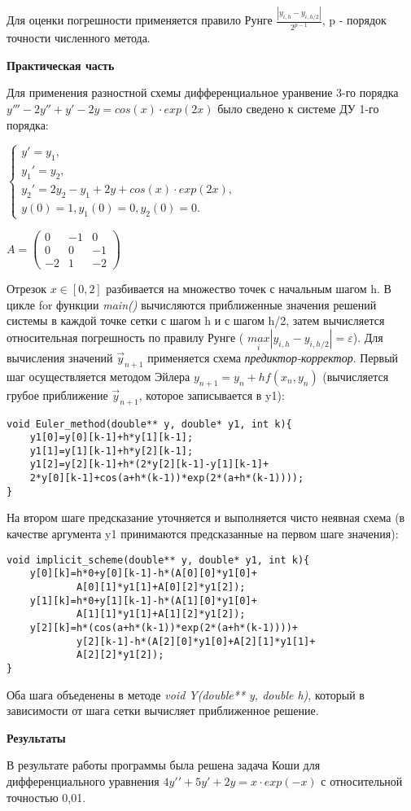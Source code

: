 \documentclass{article}
\begin{document}
Для оценки погрешности применяется правило Рунге \(\frac{|y_{i,h}-y_{i,h/2}|}{2^{p-1}}\), p - порядок точности численного метода.

\LARGE
\textbf{Практическая часть}

\Large
Для применения разностной схемы дифференциальное уранвение 3-го порядка \( y'''-2y''+y'-2y=cos(x)\cdot exp(2x)\) было сведено к системе ДУ 1-го порядка: 

\(\begin{cases}
 y'=y_{1}, \\ 
 y_{1}'=y_{2},\\ 
 y_{2}'=2y_{2}-y_{1}+2y+cos(x)\cdot exp(2x),\\
 y(0)=1,y_{1}(0)=0,y_{2}(0)=0.
\end{cases}\)

\(A=\begin{pmatrix}
0 & -1 & 0 \\ 
0 & 0 & -1\\ 
-2 & 1 & -2
\end{pmatrix}\)

Отрезок \(x\in [0,2]\) разбивается на множество точек с начальным шагом h.
В цикле for функции \textit{main()} вычисляются приближенные значения решений системы в каждой точке сетки с шагом h и с шагом h/2, затем вычисляется относительная погрешность по правилу Рунге ( \(\underset{i}{max}|y_{i,h}-y_{i,h/2}|=\varepsilon\)). Для вычисления значений \(\vec{y}_{n+1}\) применяется схема \textit{предиктор-корректор}. Первый шаг осуществляется методом Эйлера \(y_{n+1}=y_{n}+hf(x_{n},y_{n})\) (вычисляется грубое приближение \(\vec{y}_{n+1}\), которое записывается в y1): 
\begin{verbatim}
void Euler_method(double** y, double* y1, int k){
	y1[0]=y[0][k-1]+h*y[1][k-1];
	y1[1]=y[1][k-1]+h*y[2][k-1];
	y1[2]=y[2][k-1]+h*(2*y[2][k-1]-y[1][k-1]+
	2*y[0][k-1]+cos(a+h*(k-1))*exp(2*(a+h*(k-1))));
}
\end{verbatim}
На втором шаге предсказание уточняется и выполняется чисто неявная схема (в качестве аргумента y1 принимаются предсказанные на первом шаге значения):
\begin{verbatim}
void implicit_scheme(double** y, double* y1, int k){
	y[0][k]=h*0+y[0][k-1]-h*(A[0][0]*y1[0]+
	        A[0][1]*y1[1]+A[0][2]*y1[2]);
	y[1][k]=h*0+y[1][k-1]-h*(A[1][0]*y1[0]+
	        A[1][1]*y1[1]+A[1][2]*y1[2]);
	y[2][k]=h*(cos(a+h*(k-1))*exp(2*(a+h*(k-1))))+
	        y[2][k-1]-h*(A[2][0]*y1[0]+A[2][1]*y1[1]+
	        A[2][2]*y1[2]);
}
\end{verbatim}
Оба шага объеденены в методе \textit{void Y(double** y, double h)}, который в зависимости от шага сетки вычисляет приближенное решение.

\LARGE
\textbf{Результаты}

\Large
В результате работы программы была решена задача Коши для дифференциального уравнения \( 4y′′+ 5y′+ 2y=x·exp(−x)\) с относительной точностью 0,01.
\end{document}
